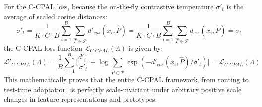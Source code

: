 \documentclass{article}
\theoremstyle{plain}
\theoremstyle{definition}
\theoremstyle{remark}
\begin{document}
For the C-CPAL loss, because the on-the-fly contrastive temperature $\sigma'_t$ is the average of scaled cosine distances:
\begin{equation}
\sigma'_t = \frac{1}{K \cdot C \cdot B} \sum_{i=1}^B \sum_{\hat{P} \in \mathcal{P}} d'_{cos}(x_i, \hat{P}) = \frac{1}{K \cdot C \cdot B} \sum_{i=1}^B \sum_{\hat{P} \in \mathcal{P}} d_{cos}(x_i, \hat{P}) = \sigma_t
\end{equation}
the C-CPAL loss function $\mathcal{L}_{C\text{-}CPAL}(\Lambda)$ is given by:
\begin{equation}
\mathcal{L}'_{C\text{-}CPAL}(\Lambda) = \frac{1}{B} \sum_{i=1}^B \bigg[ \frac{d'^+_i}{\sigma'_t} + \log \sum_{\hat{P} \in \mathcal{P}} \exp\left(-d'_{cos}(x_i, \hat{P}) / \sigma'_t\right) \bigg] = \mathcal{L}_{C\text{-}CPAL}(\Lambda)
\end{equation}
This mathematically proves that the entire C-CPAL framework, from routing to test-time adaptation, is perfectly scale-invariant under arbitrary positive scale changes in feature representations and prototypes.
\end{document}
